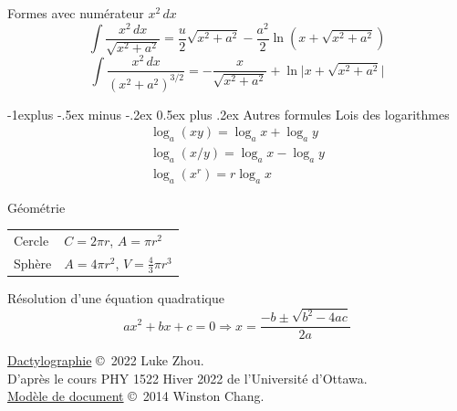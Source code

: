 \documentclass[10pt,landscape]{article}
\makeatletter
\renewcommand{\subsection}{\@startsection{subsection}{2}{0mm}%
                                {-1explus -.5ex minus -.2ex}%
                                {0.5ex plus .2ex}%
                                {\normalfont\normalsize\bfseries}}
\newcommand{\extraline}{\vspace{1em}}
\newcommand{\halfline}{\vspace{0.5em}}
\newcommand{\tableindent}{\hspace{1.5em}}
\makeatother
\begin{document}
\begin{multicols}{3}
\columnbreak
Formes avec numérateur $x^2\,dx$
\[ \int \frac{x^2\,dx}{\sqrt{x^2+a^2}} =  \frac{u}{2}\sqrt{x^2+a^2} - \frac{a^2}{2}\ln(x+\sqrt{x^2+a^2}) \]
%
\[ \int \frac{x^2\,dx}{(x^2+a^2)^{3/2}} = -\frac{x}{\sqrt{x^2+a^2}} + \ln \lvert x + \sqrt{x^2+a^2} \rvert \]


\subsection{Autres formules}
Lois des logarithmes
\begin{gather*}
\log_a (xy) = \log_a x + \log_a y \\
 \log_a (x/y) = \log_a x - \log_a y \\
\log_a (x^r) = r\log_a x
\end{gather*}

Géométrie \\
\halfline
\begin{tabular}{@{\tableindent}ll@{}}
	Cercle & $C = 2\pi r $, $A =\pi r^2$ \\
	Sphère & $A = 4\pi r^2$, $V = \frac{4}{3}\pi r^3 $ \\
\end{tabular}
\extraline

Résolution d'une équation quadratique
\[ ax^2 + bx + c = 0 \Longrightarrow x = \frac{-b \pm \sqrt{b^2-4ac} }{2a} \]






\hrulefill


\scriptsize

\href{https://github.com/zhouluke/PhysicsFormulas}{Dactylographie}  \copyright\ 2022 Luke Zhou. \\
D'après le cours PHY 1522 Hiver 2022 de l'Université d'Ottawa. \\
\href{http://wch.github.io/latexsheet/}{Modèle de document}  \copyright\ 2014 Winston Chang.


\end{multicols}
\end{document}
